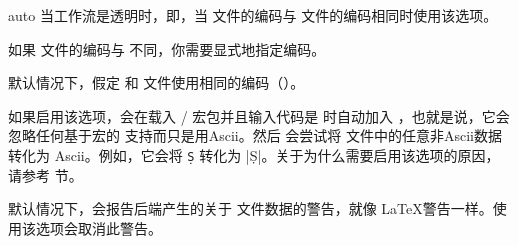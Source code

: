 \begin{optionlist}
\begin{valuelist}

\item[auto] %
当工作流是透明时，即，当  文件的编码与  文件的编码相同时使用该选项。

\item[\prm{encoding}] %
如果  文件的编码与  不同，你需要显式地指定编码。

\end{valuelist}

默认情况下，\biblatex 假定  和  文件使用相同的编码（）。


如果启用该选项，\biblatex 会在载入 \slash {} 宏包并且输入代码是 \utf 时自动加入 ，也就是说，它会忽略任何基于宏的 \utf 支持而只是用Ascii。然后 \biber 会尝试将  文件中的任意非Ascii数据转化为 Ascii。例如，它会将 \texttt{\d{S}} 转化为 |\d{S}|。关于为什么需要启用该选项的原因，请参考  节。


默认情况下，\biblatex 会报告后端产生的关于  文件数据的警告，就像 \LaTeX 警告一样。使用该选项会取消此警告。



\end{optionlist}
